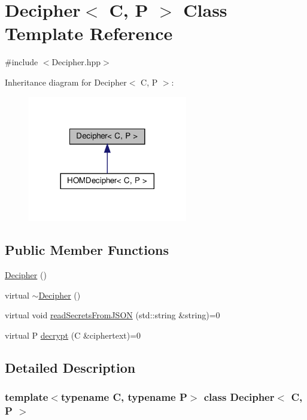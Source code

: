 \hypertarget{classDecipher}{}\section{Decipher$<$ C, P $>$ Class Template Reference}
\label{classDecipher}


{\ttfamily \#include $<$Decipher.\+hpp$>$}



Inheritance diagram for Decipher$<$ C, P $>$\+:\nopagebreak
\begin{figure}[H]
\begin{center}
\leavevmode
\includegraphics[width=197pt]{classDecipher__inherit__graph}
\end{center}
\end{figure}
\subsection*{Public Member Functions}
\begin{DoxyCompactItemize}
\item 
\hyperlink{classDecipher_a08c3ce832e3884da97f36fcfac6f70db}{Decipher} ()
\item 
virtual \hyperlink{classDecipher_af1489f4e86a28217bdee9cf16d983faf}{$\sim$\+Decipher} ()
\item 
virtual void \hyperlink{classDecipher_a39aea002012130201e12a8fa7d84dda5}{read\+Secrets\+From\+J\+S\+ON} (std\+::string \&string)=0
\item 
virtual P \hyperlink{classDecipher_ac6b8c369eda2d7e17fa90cb594cf41b6}{decrypt} (C \&ciphertext)=0
\end{DoxyCompactItemize}


\subsection{Detailed Description}
\subsubsection*{template$<$typename C, typename P$>$\newline
class Decipher$<$ C, P $>$}

